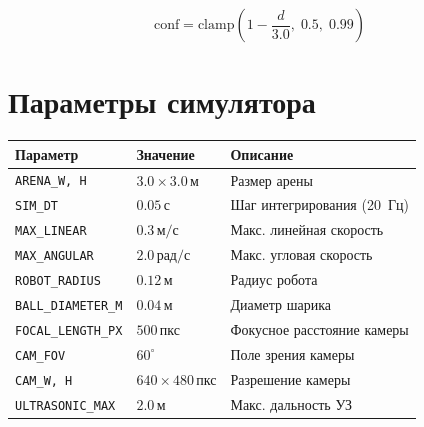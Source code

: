\begin{equation}
  \text{conf} = \mathrm{clamp}\!\left(1 - \frac{d}{3.0},\; 0.5,\; 0.99\right)
  \label{eq:sim_conf}
\end{equation}

\section{Параметры симулятора}

\begin{center}
\begin{tabular}{lll}
\toprule
\textbf{Параметр} & \textbf{Значение} & \textbf{Описание}\\
\midrule
\texttt{ARENA\_W, H}        & $3.0 \times 3.0\,\text{м}$ & Размер арены\\
\texttt{SIM\_DT}            & $0.05\,\text{с}$ & Шаг интегрирования (20~Гц)\\
\texttt{MAX\_LINEAR}        & $0.3\,\text{м/с}$ & Макс. линейная скорость\\
\texttt{MAX\_ANGULAR}       & $2.0\,\text{рад/с}$ & Макс. угловая скорость\\
\texttt{ROBOT\_RADIUS}      & $0.12\,\text{м}$ & Радиус робота\\
\texttt{BALL\_DIAMETER\_M}  & $0.04\,\text{м}$ & Диаметр шарика\\
\texttt{FOCAL\_LENGTH\_PX}  & $500\,\text{пкс}$ & Фокусное расстояние камеры\\
\texttt{CAM\_FOV}           & $60^\circ$ & Поле зрения камеры\\
\texttt{CAM\_W, H}          & $640 \times 480\,\text{пкс}$ & Разрешение камеры\\
\texttt{ULTRASONIC\_MAX}    & $2.0\,\text{м}$ & Макс. дальность УЗ\\
\bottomrule
\end{tabular}
\end{center}

